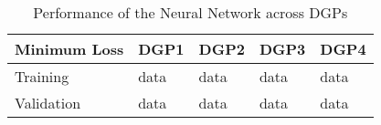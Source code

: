 

\begin{table}[]
\centering
\caption{Performance of the Neural Network across DGPs}
\label{tab:table2}
\begin{tabular}{@{}lllll@{}}
\toprule
\addlinespace
Minimum Loss                & DGP1 & DGP2 & DGP3 & DGP4 \\ \midrule
Training    & data & data & data & data \\
Validation  & data & data & data & data \\ \bottomrule
\end{tabular}
\end{table}
